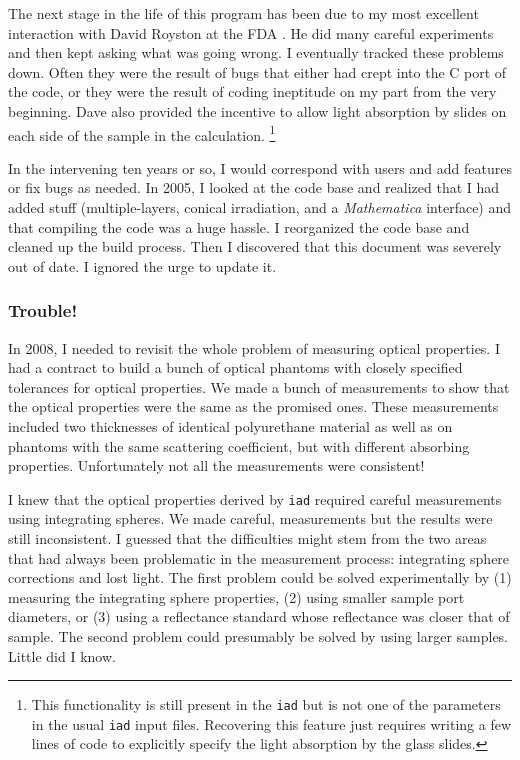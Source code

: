 \documentclass{article}
\newcommand\iadprog{\texttt{iad}}
\begin{document}
The next stage in the life of this program has been due to my most excellent
interaction with David Royston at the FDA \cite{royston96}.  He did many careful experiments and
then kept asking what was going wrong.  I eventually tracked these
problems down.  Often they were the result of bugs that either had crept into the
C port of the code, or they were the result of coding ineptitude on my part
from the very beginning.  Dave also provided the incentive to allow
light absorption by slides on each side of the sample in the calculation.%
\footnote{This functionality is still present in the \iadprog{} but
is not one of the parameters in the usual \iadprog{} input files.  Recovering
this feature just requires writing a few lines of code to explicitly specify
the light absorption by the glass slides.}

In the intervening ten years or so, I would correspond with users and add
features or fix bugs as needed.  In 2005, I looked at the code base and realized that I had added
stuff (multiple-layers, conical irradiation, and a \textit{Mathematica} interface) and that 
compiling the code was a huge hassle.  I reorganized the code
base and cleaned up the build process.  Then I discovered that this document was
severely out of date.  I ignored the urge to update it.

\subsubsection*{Trouble!}

In 2008, I needed to revisit the whole problem of measuring optical
properties.  I had a contract to build a bunch of optical phantoms with closely
specified tolerances for optical properties.  We made a bunch of measurements
to show that the optical properties were the same as the promised ones.  These measurements 
included two thicknesses of identical polyurethane material as well as on phantoms with the
same scattering coefficient, but with different absorbing properties.  Unfortunately
not all the measurements were consistent!

I knew that the optical properties derived by \iadprog{} required careful measurements
using integrating spheres.  We made careful, measurements but the results were still
inconsistent.  I guessed that the difficulties might stem from the two areas that had
always been problematic 
in the measurement process: integrating sphere corrections and lost light.
The first problem could be solved experimentally by (1) measuring the integrating
sphere properties, (2) using smaller sample port diameters, or (3) using a reflectance 
standard whose reflectance was 
closer that of sample.  The second problem could presumably be solved
by using larger samples.  Little did I know.
\end{document}
